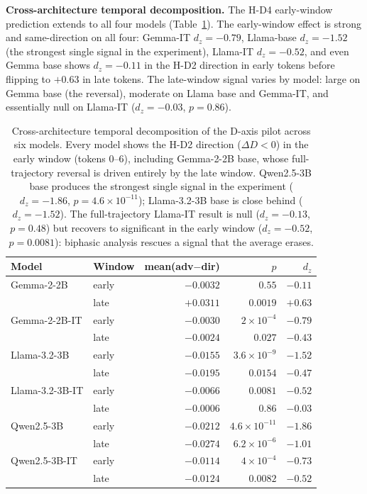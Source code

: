 \documentclass{article}
\begin{document}
\textbf{Cross-architecture temporal decomposition.}
The H-D4 early-window prediction extends to all four models
(Table~\ref{tab:daxis-temporal-crossarch}). The early-window effect
is strong and same-direction on all four: Gemma-IT $d_z = -0.79$,
Llama-base $d_z = \mathbf{-1.52}$ (the strongest single signal in
the experiment), Llama-IT $d_z = -0.52$, and even Gemma base
shows $d_z = -0.11$ in the H-D2 direction in early tokens before
flipping to $+0.63$ in late tokens. The late-window signal varies
by model: large on Gemma base (the reversal), moderate on Llama
base and Gemma-IT, and essentially null on Llama-IT
($d_z = -0.03$, $p = 0.86$).

\begin{table}[h]
\centering
\small
\begin{tabular}{llrrr}
\toprule
Model & Window & mean(adv$-$dir) & $p$ & $d_z$ \\
\midrule
Gemma-2-2B      & early & $-0.0032$ & $0.55$                  & $-0.11$ \\
                & late  & $+0.0311$ & $0.0019$                & $+0.63$ \\
Gemma-2-2B-IT   & early & $-0.0030$ & $2\!\times\!10^{-4}$    & $-0.79$ \\
                & late  & $-0.0024$ & $0.027$                 & $-0.43$ \\
Llama-3.2-3B    & early & $-0.0155$ & $3.6\!\times\!10^{-9}$  & $-1.52$ \\
                & late  & $-0.0195$ & $0.0154$                & $-0.47$ \\
Llama-3.2-3B-IT & early & $-0.0066$ & $0.0081$                & $-0.52$ \\
                & late  & $-0.0006$ & $0.86$                  & $-0.03$ \\
Qwen2.5-3B      & early & $-0.0212$ & $4.6\!\times\!10^{-11}$ & $\mathbf{-1.86}$ \\
                & late  & $-0.0274$ & $6.2\!\times\!10^{-6}$  & $-1.01$ \\
Qwen2.5-3B-IT   & early & $-0.0114$ & $4\!\times\!10^{-4}$    & $-0.73$ \\
                & late  & $-0.0124$ & $0.0082$                & $-0.52$ \\
\bottomrule
\end{tabular}
\caption{Cross-architecture temporal decomposition of the D-axis
pilot across six models. Every model shows the H-D2 direction
($\Delta D < 0$) in the early window (tokens 0--6), including
Gemma-2-2B base, whose full-trajectory reversal is driven entirely
by the late window. Qwen2.5-3B base produces the strongest single
signal in the experiment ($d_z = -1.86$, $p = 4.6\!\times\!10^{-11}$);
Llama-3.2-3B base is close behind ($d_z = -1.52$). The
full-trajectory Llama-IT result is null ($d_z = -0.13$, $p = 0.48$)
but recovers to significant in the early window ($d_z = -0.52$,
$p = 0.0081$): biphasic analysis rescues a signal that the
average erases.}
\label{tab:daxis-temporal-crossarch}
\end{table}
\end{document}
